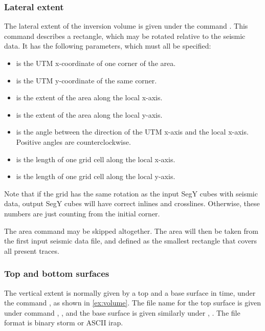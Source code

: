 \subsubsection{Lateral extent}
The lateral extent of the inversion volume is given under the command . This command describes a rectangle, which may be rotated relative to the seismic data. It has the following parameters, which must all be specified:
\begin{itemize}
\item {} is the UTM x-coordinate of one corner of the area.
\item {} is the UTM y-coordinate of the same corner.
\item {} is the extent of the area along the local x-axis.
\item {} is the extent of the area along the local y-axis.
\item {} is the angle between the direction of the UTM x-axis and the local x-axis. Positive angles are counterclockwise.
\item {} is the length of one grid cell along the local x-axis.
\item {} is the length of one grid cell along the local y-axis.
\end{itemize}
Note that if the grid has the same rotation as the input SegY cubes with seismic data, output SegY cubes will have correct inlines and crosslines. Otherwise, these numbers are just counting from the initial corner.

The area command may be skipped altogether. The area will then be taken from the first input seismic data file, and defined as the smallest rectangle that covers all present traces.

\subsubsection{Top and bottom surfaces}
The vertical extent is normally given by a top and a base surface in time, under the command , as shown in \autoref{ex:volume}. The file name for the top surface is given under command , , and the base surface is given similarly under , . The file format is binary storm or ASCII irap.


